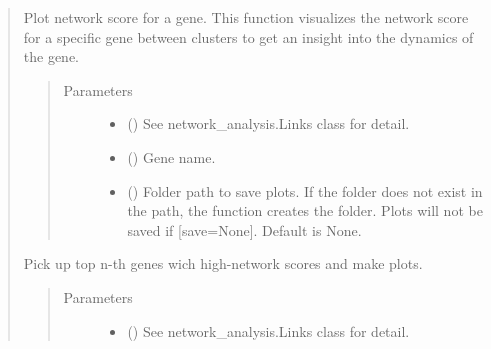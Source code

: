 \documentclass[letterpaper,10pt,english]{sphinxmanual}
\begin{document}
\begin{quote}
\begin{fulllineitems}
\begin{fulllineitems}
\label{\detokenize{modules/celloracle.network_analysis:celloracle.network_analysis.Links.plot_score_per_cluster}}
Plot network score for a gene.
This function visualizes the network score for a specific gene between clusters to get an insight into the dynamics of the gene.
\begin{quote}\begin{description}
\item[{Parameters}] \leavevmode\begin{itemize}
\item {} 
 ({\hyperref[\detokenize{modules/celloracle:celloracle.Links}]{}}) \textendash{} See network\_analysis.Links class for detail.

\item {} 
 () \textendash{} Gene name.

\item {} 
 () \textendash{} Folder path to save plots. If the folder does not exist in the path, the function creates the folder.
Plots will not be saved if {[}save=None{]}. Default is None.

\end{itemize}

\end{description}\end{quote}

\end{fulllineitems}


\begin{fulllineitems}
\label{\detokenize{modules/celloracle.network_analysis:celloracle.network_analysis.Links.plot_scores_as_rank}}
Pick up top n-th genes wich high-network scores and make plots.
\begin{quote}\begin{description}
\item[{Parameters}] \leavevmode\begin{itemize}
\item {} 
 ({\hyperref[\detokenize{modules/celloracle:celloracle.Links}]{}}) \textendash{} See network\_analysis.Links class for detail.


\end{itemize}
\end{description}
\end{quote}
\end{fulllineitems}
\end{fulllineitems}
\end{quote}
\end{document}
